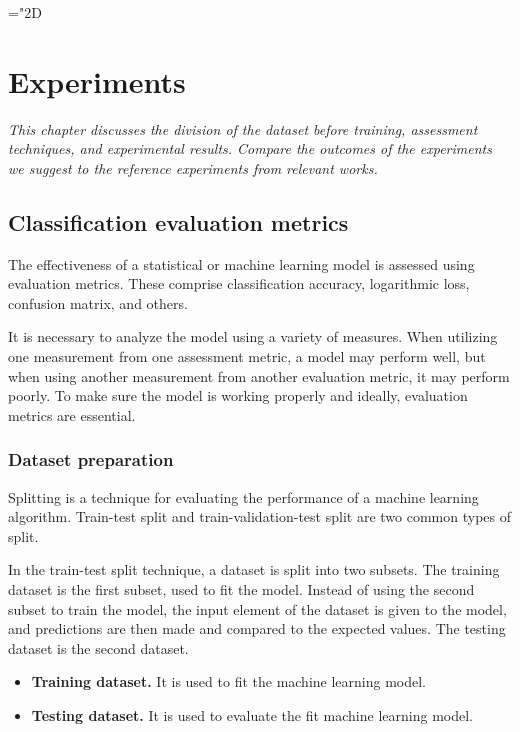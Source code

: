 \mathchardef\mhyphen="2D

\chapter{Experiments}
\label{chap:experiments}
	\textit{\hspace{0.5cm}This chapter discusses the division of the dataset before training, assessment techniques, and experimental results. Compare the outcomes of the experiments we suggest to the reference experiments from relevant works.}
\minitoc


\section{Classification evaluation metrics}
\label{sec:class_metrics}
\hspace{0.5cm}The effectiveness of a statistical or machine learning model is assessed using evaluation metrics. These comprise classification accuracy, logarithmic loss, confusion matrix, and others. 

It is necessary to analyze the model using a variety of measures. When utilizing one measurement from one assessment metric, a model may perform well, but when using another measurement from another evaluation metric, it may perform poorly. To make sure the model is working properly and ideally, evaluation metrics are essential.

\subsection{Dataset preparation}
\hspace{0.5cm}Splitting is a technique for evaluating the performance of a machine learning algorithm. Train-test split and train-validation-test split are two common types of split.

In the train-test split technique, a dataset is split into two subsets.
The training dataset is the first subset, used to fit the model. Instead of using the second subset to train the model, the input element of the dataset is given to the model, and predictions are then made and compared to the expected values. The testing dataset is the second dataset.
\begin{itemize}
	\item \textbf{Training dataset.} It is used to fit the machine learning model.
	\item \textbf{Testing dataset.} It is used to evaluate the fit machine learning model.
\end{itemize}

